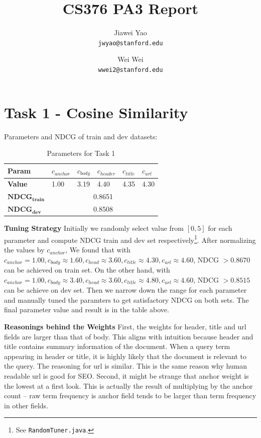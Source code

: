\documentclass{article}
\begin{document}
\title{CS376 PA3 Report}

\author{
  Jiawei Yao\\
  \texttt{jwyao@stanford.edu}
  \and
  Wei Wei\\
  \texttt{wwei2@stanford.edu}
}

\maketitle

\section{Task 1 - Cosine Similarity}

Parameters and NDCG of train and dev datasets:

\begin{table}[!htb]
    \centering
    \begin{tabular}{ | l | l | l | l | l | l |}
    \hline
    \textbf{Param} & $c_{anchor}$ & $c_{body}$ & $c_{header}$ & $c_{title}$ & $c_{url}$ \\
    \hline
    \textbf{Value} & 1.00 & 3.19 & 4.40 & 4.35 & 4.30 \\
    \hline
    $\mathbf{NDCG_{train}}$ & \multicolumn{5}{c|}{0.8651} \\
    \hline
    $\mathbf{NDCG_{dev}}$ & \multicolumn{5}{c|}{0.8508} \\
    \hline
    \end{tabular}
    \caption{Parameters for Task 1}
\end{table}

\textbf{Tuning Strategy} Initially we randomly select value from $[0,5]$ for each parameter and compute NDCG train and dev set respectively\footnote{See \texttt{RandomTuner.java}.}. After normalizing the values by $c_{anchor}$, We found that with $c_{anchor}= 1.00, c_{body}\approx 1.60, c_{head}\approx 3.60, c_{title}\approx4.30, c_{url}\approx4.60$, NDCG $> 0.8670$ can be achieved on train set. On the other hand, with $c_{anchor}= 1.00, c_{body}\approx 3.40, c_{head}\approx 3.60, c_{title}\approx4.80, c_{url}\approx4.60$, NDCG $> 0.8515$ can be achieve on dev set. Then we narrow down the range for each parameter and manually tuned the paramters to get satisfactory NDCG on both sets. The final parameter value and result is in the table above.

\textbf{Reasonings behind the Weights} First, the weights for header, title and url fields are larger than that of body. This aligns with intuition because header and title contains summary information of the document. When a query term appearing in header or title, it is highly likely that the document is relevant to the query. The reasoning for url is similar. This is the same reason why human readable url is good for SEO. Second, it might be strange that anchor weight is the lowest at a first look. This is actually the result of multiplying by the anchor count -- raw term frequency is anchor field tends to be larger than term frequency in other fields.
\end{document}

